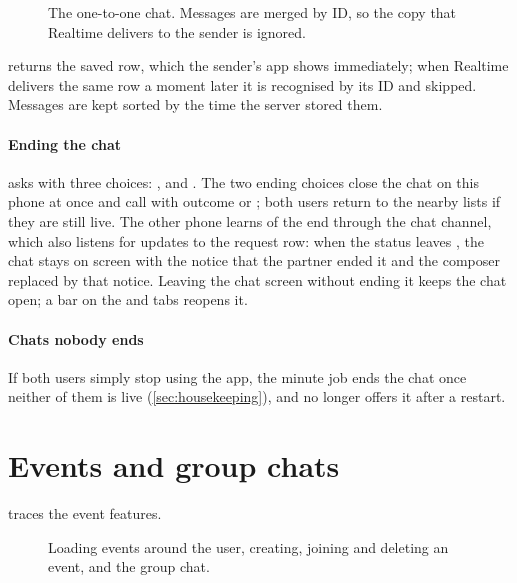 \begin{figure}[ht]
  \centering
  
  \caption{The one-to-one chat. Messages are merged by ID, so the copy that Realtime delivers to the
    sender is ignored.}
  \label{fig:seq-chat}
\end{figure}

 returns the saved row, which the sender's app shows immediately; when Realtime
delivers the same row a moment later it is recognised by its ID and skipped. Messages are kept sorted by
the time the server stored them.

\paragraph{Ending the chat}  asks  with three choices: ,
 and . The two ending choices close the chat on this phone at once and call
 with outcome  or ; both users return to the nearby lists if they
are still live. The other phone learns of the end through the chat channel, which also listens for
updates to the request row: when the status leaves , the chat stays on screen with the
notice that the partner ended it and the composer replaced by that notice. Leaving the chat screen without
ending it keeps the chat open; a bar on the  and  tabs reopens it.

\paragraph{Chats nobody ends} If both users simply stop using the app, the minute job ends the chat once
neither of them is live (\cref{sec:housekeeping}), and  no longer offers it after a
restart.

\section{Events and group chats}
\label{sec:flow-events}

 traces the event features.

\begin{figure}[ht]
  \centering
  
  \caption{Loading events around the user, creating, joining and deleting an event, and the group chat.}
  \label{fig:seq-events}
\end{figure}

